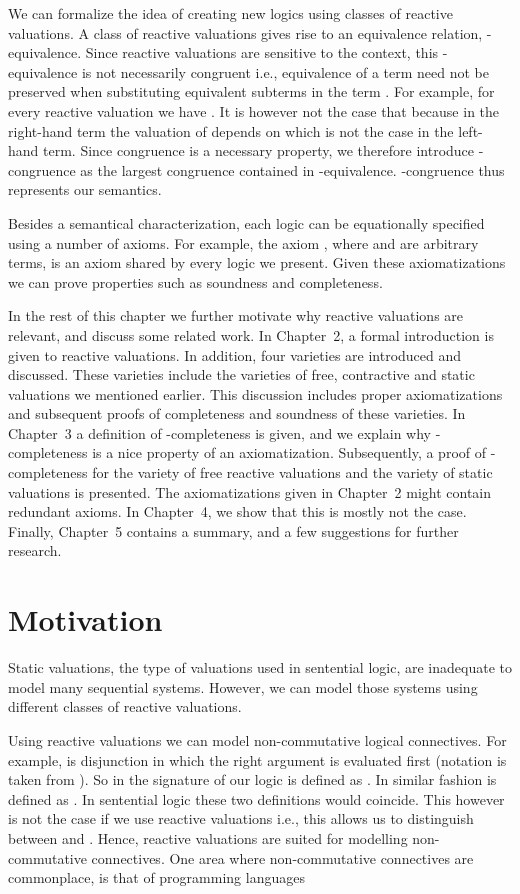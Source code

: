 \documentclass[a4paper,twoside,openright]{report}
\begin{document}
We can formalize the idea of creating new logics using classes of reactive valuations. A class  of reactive valuations gives rise to an equivalence relation, -equivalence. Since reactive valuations are sensitive to the context, this -equivalence is not necessarily congruent i.e., equivalence of a term  need not be preserved when substituting equivalent subterms in the term . For example, for every reactive valuation  we have . It is however not the case that  because in the right-hand term the valuation of  depends on  which is not the case in the left-hand term. Since congruence is a necessary property, we therefore introduce -congruence as the largest congruence contained in -equivalence. -congruence thus represents our semantics.

Besides a semantical characterization, each logic can be equationally specified using a number of axioms. For example, the axiom , where  and  are arbitrary terms, is an axiom shared by every logic we present. Given these axiomatizations we can prove properties such as soundness and completeness.

In the rest of this chapter we further motivate why reactive valuations are relevant, and discuss some related work. In Chapter~2, a formal introduction is given to reactive valuations. In addition, four varieties are introduced and discussed. These varieties include the varieties of free, contractive and static valuations we mentioned earlier. This discussion includes proper axiomatizations and subsequent proofs of completeness and soundness of these varieties. In Chapter~3 a definition of -completeness is given, and we explain why -completeness is a nice property of an axiomatization. Subsequently, a proof of -completeness for the variety of free reactive valuations and the variety of static valuations is presented. The axiomatizations given in Chapter~2 might contain redundant axioms. In Chapter~4, we show that this is mostly not the case. Finally, Chapter~5 contains a summary, and a few suggestions for further research.

\section{Motivation}
Static valuations, the type of valuations used in sentential logic, are inadequate to model many sequential systems. However, we can model those systems using different classes of reactive valuations.

Using reactive valuations we can model non-commutative logical connectives. For example,  is disjunction in which the right argument is evaluated first (notation is taken from \cite{connectives}). So in the signature of our logic  is defined as . In similar fashion  is defined as . In sentential logic these two definitions would coincide. This however is not the case if we use reactive valuations i.e., this allows us to distinguish between  and . Hence, reactive valuations are suited for modelling non-commutative connectives. One area where non-commutative connectives are commonplace, is that of programming languages
\end{document}
